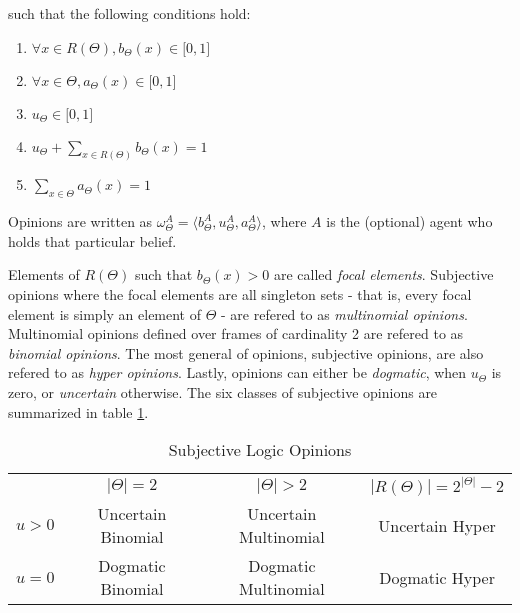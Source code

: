 \documentclass[thesis.tex]{subfiles}
\begin{document}
such that the following conditions hold:

\begin{enumerate}
  \item $\forall x \in R\left(\Theta\right), b_\Theta\left(x\right) \in \lbrack 0, 1\rbrack$
  \item $\forall x \in \Theta, a_\Theta\left(x\right) \in \lbrack 0, 1\rbrack$
  \item $u_\Theta \in \lbrack 0, 1\rbrack$
  \item $u_\Theta + \sum_{x \in R\left(\Theta\right)} b_\Theta\left(x\right) = 1$
  \item $\sum_{x \in \Theta} a_\Theta\left(x\right) = 1$
\end{enumerate}

Opinions are written as $\omega^A_\Theta = \langle b^A_\Theta, u^A_\Theta, a^A_\Theta \rangle$, where
$A$ is the (optional) agent who holds that particular belief.

Elements of $R\left(\Theta\right)$ such that $b_\Theta\left(x\right) > 0$ are called \emph{focal elements}.
Subjective opinions where the focal elements are all singleton sets - that is, every focal element is
simply an element of $\Theta$ - are refered to as \emph{multinomial opinions}. Multinomial opinions
defined over frames of cardinality 2 are refered to as \emph{binomial opinions}. The most general of
opinions, subjective opinions, are also refered to as \emph{hyper opinions}. Lastly, opinions can either
be \emph{dogmatic}, when $u_\Theta$ is zero, or \emph{uncertain} otherwise. The six classes of subjective
opinions are summarized in table \ref{tbl:sl-opinions}.

\begin{table}
  \begin{center}
    \begin{tabular}{ r|c|c|c| }
      \multicolumn{1}{r}{}
      &  \multicolumn{1}{c}{$|\Theta| = 2$}
      &  \multicolumn{1}{c}{$|\Theta| > 2$}
      &  \multicolumn{1}{c}{$|R(\Theta)| = 2^{|\Theta|} - 2$} \\
      \cline{2-4}
      $u > 0$ & Uncertain Binomial & Uncertain Multinomial & Uncertain Hyper \\
      \cline{2-4}
      $u = 0$ & Dogmatic Binomial & Dogmatic Multinomial & Dogmatic Hyper \\
      \cline{2-4}
    \end{tabular}
  \end{center}

  \caption{Subjective Logic Opinions}
  \label{tbl:sl-opinions}
\end{table}
\end{document}

